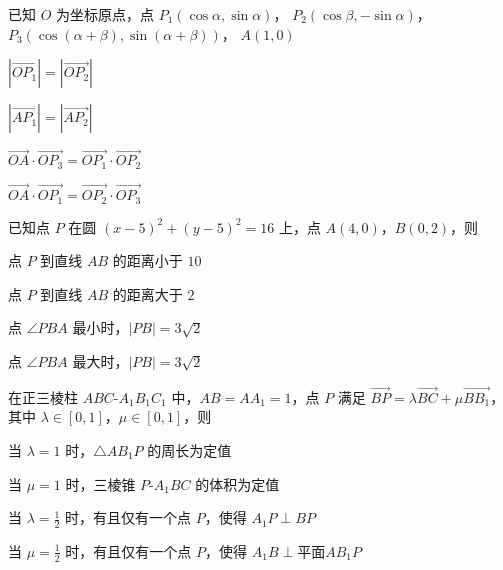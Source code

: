 \documentclass[zihao = -4]{exam-zh}
\begin{document}
\begin{question}
  已知 $O$ 为坐标原点，点
  $P_1(\cos\alpha,  \sin\alpha)$，
  $P_2(\cos\beta , -\sin\alpha)$，
  $P_3(\cos(\alpha + \beta),  \sin(\alpha + \beta))$，
  $A(1, 0)$ \paren
  \begin{choices}
    \item $|\overrightarrow{OP_1}| = |\overrightarrow{OP_2}|$
    \item $|\overrightarrow{AP_1}| = |\overrightarrow{AP_2}|$
    \item $\overrightarrow{OA} \cdot \overrightarrow{OP_3}
      = \overrightarrow{OP_1} \cdot \overrightarrow{OP_2}$
    \item $\overrightarrow{OA} \cdot \overrightarrow{OP_1}
      = \overrightarrow{OP_2} \cdot \overrightarrow{OP_3}$
  \end{choices}
\end{question}

\begin{question}
  已知点 $P$ 在圆 $(x - 5)^2 + (y - 5)^2 = 16$ 上，点 $A(4, 0)$，$B(0, 2)$，则 \paren
  \begin{choices}
    \item 点 $P$ 到直线 $AB$ 的距离小于 $10$
    \item 点 $P$ 到直线 $AB$ 的距离大于 $2$
    \item 点 $\angle PBA$ 最小时，$|PB| = 3 \sqrt{2}$
    \item 点 $\angle PBA$ 最大时，$|PB| = 3 \sqrt{2}$
  \end{choices}
\end{question}

\begin{question}
  在正三棱柱 $ABC$-$A_1 B_1 C_1$ 中，$AB = A A_1 = 1$，点 $P$ 满足
  $\overrightarrow{BP} = \lambda \overrightarrow{BC} + \mu \overrightarrow{BB_1}$，
  其中 $\lambda \in [0, 1]$，$\mu \in [0, 1]$，则 \paren
  \begin{choices}
    \item 当 $\lambda = 1$ 时，$\triangle A B_1 P$ 的周长为定值
    \item 当 $\mu = 1$ 时，三棱锥 $P$-$A_1 B C$ 的体积为定值
    \item 当 $\lambda = \frac{1}{2}$ 时，有且仅有一个点 $P$，使得 $A_1 P \perp BP$
    \item 当 $\mu = \frac{1}{2}$ 时，有且仅有一个点 $P$，使得 $A_1 B \perp \text{平面} A B_1 P$
  \end{choices}
\end{question}
\end{document}
